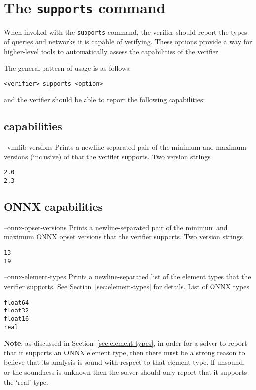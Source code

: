 
\section{The \texttt{supports} command}
\label{sec:global_capabilities}

When invoked with the \texttt{supports} command, the verifier should report the types of queries and networks it is capable of verifying.
These options provide a way for higher-level tools to automatically assess the capabilities of the verifier.

The general pattern of usage is as follows:
\begin{lstlisting}[style=bash]
<verifier> supports <option>
\end{lstlisting}
and the verifier should be able to report the following capabilities:

\subsection{\vnnlib{} capabilities}

\clOutputOption
{--vnnlib-versions}
{Prints a newline-separated pair of the minimum and maximum versions (inclusive) of \vnnlib{} that the verifier supports.}
{Two version strings}
\begin{lstlisting}[style=bash]
%*\exampleVerifier* supports --vnnlib-versions
2.0
2.3
\end{lstlisting}

\subsection{ONNX capabilities}

\clOutputOption
{--onnx-opset-versions}
{Prints a newline-separated pair of the minimum and maximum \href{https://onnxruntime.ai/docs/reference/compatibility.html\#onnx-opset-support}{ONNX opset versions} that the verifier supports.}
{Two version strings}
\begin{lstlisting}[style=bash]
%*\exampleVerifier* supports --onnx-opset-versions
13
19
\end{lstlisting}

\clOutputOption
{--onnx-element-types}
{Prints a newline-separated list of the element types that the verifier supports. See Section~\ref{sec:element-types} for details.}
{List of ONNX types}
\begin{lstlisting}[style=bash]
%*\exampleVerifier* supports --onnx-element-types
float64
float32
float16
real
\end{lstlisting}
\textbf{Note}: as discussed in Section~\ref{sec:element-types}, in order for a solver to report that it supports an ONNX element type, then there must be a strong reason to believe that its analysis is sound with respect to that element type. If unsound, or the soundness is unknown then the solver should only report that it supports the `real' type.


